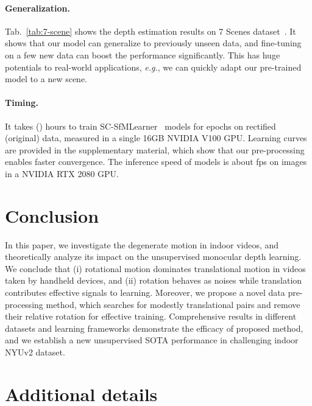 \documentclass{article}
\newcommand{\tabref}[1]{Tab.~\ref{#1}}
\def\eg{\emph{e.g.}}
\begin{document}
\paragraph{Generalization.}

\tabref{tab:7-scene} shows the depth estimation results on 7 Scenes dataset~\cite{shotton2013scene}.
It shows that our model can generalize to previously unseen data,
and fine-tuning on a few new data can boost the performance significantly.
This has huge potentials to real-world applications,
\eg, we can quickly adapt our pre-trained model to a new scene.







\paragraph{Timing.}
It takes  () hours to train SC-SfMLearner~\cite{bian2019depth} models for  epochs on rectified (original) data, measured in a single 16GB NVIDIA V100 GPU.
Learning curves are provided in the supplementary material,
which show that our pre-processing enables faster convergence.
The inference speed of models is about fps on  images in a NVIDIA RTX 2080 GPU.


\section{Conclusion}
In this paper, we investigate the degenerate motion in indoor videos,
and theoretically analyze its impact on the unsupervised monocular depth learning.
We conclude that (i) rotational motion dominates translational motion in videos taken by handheld devices,
and (ii) rotation behaves as noises while translation contributes effective signals to learning.
Moreover, we propose a novel data pre-processing method,
which searches for modestly translational pairs and remove their relative rotation for effective training.
Comprehensive results in different datasets and learning frameworks demonstrate the efficacy of proposed method,
and we establish a new unsupervised SOTA performance in challenging indoor NYUv2 dataset. 









\clearpage

\section{Additional details}
\end{document}
